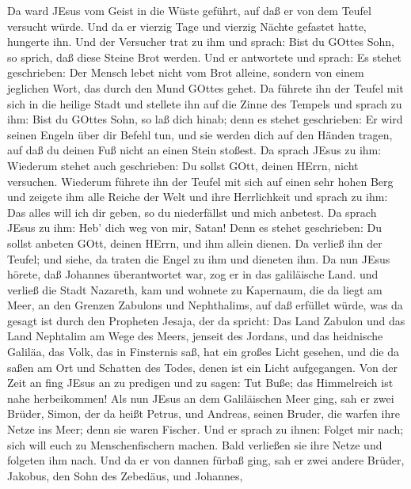  Da ward JEsus vom Geist in die Wüste geführt, auf daß er
von dem Teufel versucht würde.  Und da er vierzig Tage und
vierzig Nächte gefastet hatte, hungerte ihn.  Und der
Versucher trat zu ihm und sprach: Bist du GOttes Sohn, so sprich, daß
diese Steine Brot werden.  Und er antwortete und sprach: Es
stehet geschrieben: Der Mensch lebet nicht vom Brot alleine, sondern von
einem jeglichen Wort, das durch den Mund GOttes gehet.  Da
führete ihn der Teufel mit sich in die heilige Stadt und stellete ihn
auf die Zinne des Tempels  und sprach zu ihm: Bist du GOttes
Sohn, so laß dich hinab; denn es stehet geschrieben: Er wird seinen
Engeln über dir Befehl tun, und sie werden dich auf den Händen tragen,
auf daß du deinen Fuß nicht an einen Stein stoßest.  Da
sprach JEsus zu ihm: Wiederum stehet auch geschrieben: Du sollst GOtt,
deinen HErrn, nicht versuchen.  Wiederum führete ihn der
Teufel mit sich auf einen sehr hohen Berg und zeigete ihm alle Reiche
der Welt und ihre Herrlichkeit  und sprach zu ihm: Das alles
will ich dir geben, so du niederfällst und mich anbetest. 
Da sprach JEsus zu ihm: Heb' dich weg von mir, Satan! Denn es stehet
geschrieben: Du sollst anbeten GOtt, deinen HErrn, und ihm allein
dienen.  Da verließ ihn der Teufel; und siehe, da traten
die Engel zu ihm und dieneten ihm.  Da nun JEsus hörete,
daß Johannes überantwortet war, zog er in das galiläische Land.
 und verließ die Stadt Nazareth, kam und wohnete zu
Kapernaum, die da liegt am Meer, an den Grenzen Zabulons und
Nephthalims,  auf daß erfüllet würde, was da gesagt ist
durch den Propheten Jesaja, der da spricht:  Das Land
Zabulon und das Land Nephtalim am Wege des Meers, jenseit des Jordans,
und das heidnische Galiläa,  das Volk, das in Finsternis
saß, hat ein großes Licht gesehen, und die da saßen am Ort und Schatten
des Todes, denen ist ein Licht aufgegangen.  Von der Zeit
an fing JEsus an zu predigen und zu sagen: Tut Buße; das Himmelreich ist
nahe herbeikommen!  Als nun JEsus an dem Galiläischen Meer
ging, sah er zwei Brüder, Simon, der da heißt Petrus, und Andreas,
seinen Bruder, die warfen ihre Netze ins Meer; denn sie waren Fischer.
 Und er sprach zu ihnen: Folget mir nach; sich will euch zu
Menschenfischern machen.  Bald verließen sie ihre Netze und
folgeten ihm nach.  Und da er von dannen fürbaß ging, sah
er zwei andere Brüder, Jakobus, den Sohn des Zebedäus, und Johannes,
